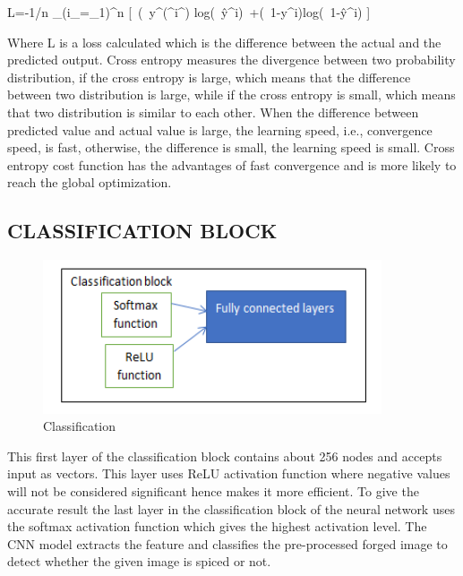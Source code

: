        L=-1/n \Sigma_(i_=_1)^n [\ (\ y^(^i^)  log(\ \^y^i)\ +(\ 1-y^i)log(\ 1-\^y^i) ]\

Where L is a loss calculated which is the difference between the actual and the predicted output. 
Cross entropy measures the divergence between two probability distribution, if the cross entropy is large, which means that the difference between two distribution is large, while if the cross entropy is small, which means that two distribution is similar to each other. When the difference between predicted value and actual value is large, the learning speed, i.e., convergence speed, is fast, otherwise, the difference is small, the learning speed is small. Cross entropy cost function has the advantages of fast convergence and is more likely to reach the global optimization. 

\subsection{CLASSIFICATION BLOCK}
\begin{figure}[htp]
\centering
\includegraphics[scale=0.5,width=10cm]{Figures/soft.PNG}
\caption{Classification}
\label{fig:universe}
\end{figure}
This first layer of the classification block contains about 256 nodes and accepts input as vectors. This layer uses ReLU activation function where negative values will not be considered significant hence makes it more efficient. To give the accurate result the last layer in the classification block of the neural network uses the softmax activation function which gives the highest activation level. The CNN model extracts the feature and classifies the pre-processed forged image to detect whether the given image is spiced or not.

